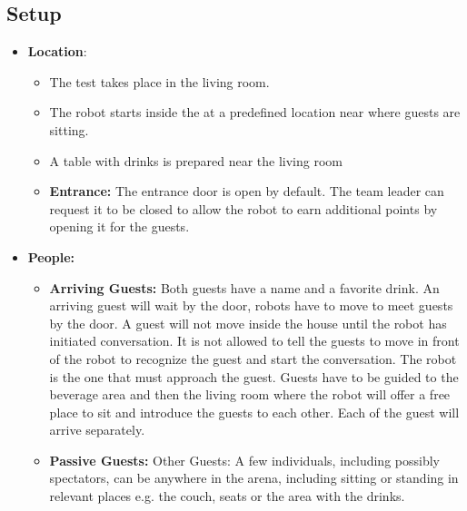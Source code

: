 \subsection*{Setup}
\begin{itemize}
	\item \textbf{Location}: 
	\begin{itemize}
	\item The test takes place in the living room.	
	\item The robot starts inside the \Arena{} at a predefined location near where guests are sitting.
	\item A table with drinks is prepared near the living room
	\item \textbf{Entrance:} The entrance door is open by default. The team leader can request it to be closed to allow the robot to earn additional points by opening it for the guests.
	\end{itemize}
	
	\item \textbf{People:} 
	\begin{itemize}
	\item \textbf{Arriving Guests:} Both guests have a name and a favorite drink. An arriving guest will wait by the door, robots have to move to meet guests by the door. A guest will not move inside the house until the robot has initiated conversation. It is not allowed to tell the guests to move in front of the robot to recognize the guest and start the conversation. The robot is the one that must approach the guest. Guests have to be guided to the beverage area and then the living room where the robot will offer a free place to sit and introduce the guests to each other. Each of the guest will arrive separately. 
	\item \textbf{Passive Guests:} Other Guests: A few individuals, including possibly spectators, can be anywhere in the arena, including sitting or standing in relevant places e.g. the couch, seats or the area with the drinks.
	\end{itemize}

\end{itemize}

